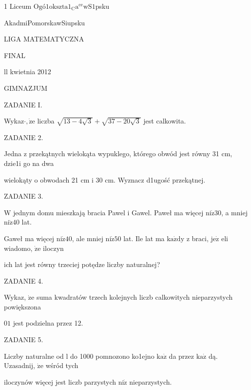 \documentclass[a4paper,12pt]{article}
\begin{document}
1 Liceum O$\mathrm{g}\text{ó} 1\mathrm{o}\mathrm{k}\mathrm{s}\mathrm{z}\mathrm{t}\mathrm{a}1_{\mathrm{C}}\mathrm{a}^{\mathrm{c}\mathrm{e}}\mathrm{w}\mathrm{S}1$psku

AkadmiPomorskawSiupsku

LIGA MATEMATYCZNA

FINAL

ll kwietnia 2012

GIMNAZJUM

ZADANIE I.

Wykaz$\cdot, \dot{\mathrm{z}}\mathrm{e}$ liczba $\sqrt{13-4\sqrt{3}}+\sqrt{37-20\sqrt{3}}$ jest calkowita.

ZADANIE 2.

Jedna z przekątnych wielokąta wypuklego, którego obwód jest równy 31 cm, dzie1i go na dwa

wielokąty o obwodach 21 cm i 30 cm. Wyznacz d1ugość przekątnej.

ZADANIE 3.

$\mathrm{W}$ jednym domu mieszkają bracia Pawel i Gawel. Paweł ma więcej $\mathrm{n}\mathrm{i}\dot{\mathrm{z}}30$, a mniej $\mathrm{n}\mathrm{i}\dot{\mathrm{z}}40$ lat.

Gaweł ma więcej $\mathrm{n}\mathrm{i}\dot{\mathrm{z}}40$, ale mniej $\mathrm{n}\mathrm{i}\dot{\mathrm{z}}50$ lat. Ile lat ma $\mathrm{k}\mathrm{a}\dot{\mathrm{z}}\mathrm{d}\mathrm{y}$ z braci, $\mathrm{j}\mathrm{e}\dot{\mathrm{z}}$ eli wiadomo, $\dot{\mathrm{z}}\mathrm{e}$ iloczyn

ich lat jest równy trzeciej potędze liczby naturalnej?

ZADANIE 4.

Wykaz, $\dot{\mathrm{z}}\mathrm{e}$ suma kwadratów trzech kolejnych liczb calkowitych nieparzystych powiększona

$01$ jest podzielna przez 12.

ZADANIE 5.

Liczby naturalne od l do 1000 pomnozono ko1ejno $\mathrm{k}\mathrm{a}\dot{\mathrm{z}}$ da przez $\mathrm{k}\mathrm{a}\dot{\mathrm{z}}$ dą. Uzasadnij, $\dot{\mathrm{z}}\mathrm{e}$ wśród tych

iloczynów więcej jest liczb parzystych $\mathrm{n}\mathrm{i}\dot{\mathrm{z}}$ nieparzystych.
\end{document}
